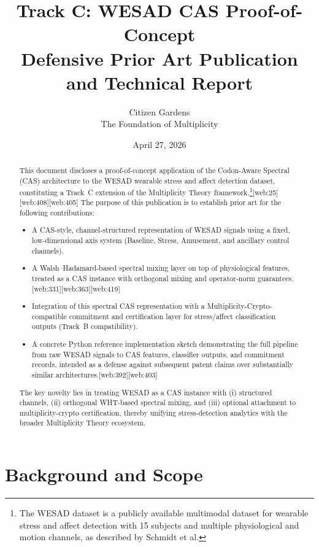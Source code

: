 \documentclass[11pt]{article}
\title{Track C: WESAD CAS Proof-of-Concept \\
Defensive Prior Art Publication and Technical Report}
\author{Citizen Gardens \\ The Foundation of Multiplicity}
\date{April 27, 2026}
\begin{document}
\maketitle

\begin{abstract}

This document discloses a proof-of-concept application of the Codon-Aware Spectral (CAS) architecture to the WESAD wearable stress and affect detection dataset, constituting a Track~C extension of the Multiplicity Theory framework.\footnote{The WESAD dataset is a publicly available multimodal dataset for wearable stress and affect detection with 15 subjects and multiple physiological and motion channels, as described by Schmidt et al.\cite{Schmidt2018_WESAD,Schmidt2018_WESAD_UBI}}[web:25][web:408][web:405] The purpose of this publication is to establish prior art for the following contributions:

\begin{itemize}
  \item A CAS-style, channel-structured representation of WESAD signals using a fixed, low-dimensional axis system (Baseline, Stress, Amusement, and ancillary control channels).
  \item A Walsh--Hadamard-based spectral mixing layer on top of physiological features, treated as a CAS instance with orthogonal mixing and operator-norm guarantees.\cite{WHTOverview,WHTOrthogonal}[web:331][web:363][web:419]
  \item Integration of this spectral CAS representation with a Multiplicity-Crypto-compatible commitment and certification layer for stress/affect classification outputs (Track~B compatibility).
  \item A concrete Python reference implementation sketch demonstrating the full pipeline from raw WESAD signals to CAS features, classifier outputs, and commitment records, intended as a defense against subsequent patent claims over substantially similar architectures.\cite{WESAD_JohnsonGitHub,WESAD_MMIImplementation}[web:392][web:403]
\end{itemize}

The key novelty lies in treating WESAD as a CAS instance with (i) structured channels, (ii) orthogonal WHT-based spectral mixing, and (iii) optional attachment to multiplicity-crypto certification, thereby unifying stress-detection analytics with the broader Multiplicity Theory ecosystem.
\end{abstract}
\newpage
\tableofcontents
\newpage
\section{Background and Scope}
\end{document}
